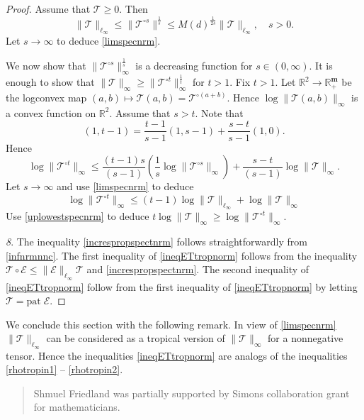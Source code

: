 \documentclass{amsart}
\newcommand{\R}{\mathbb{R}}
\newcommand{\m}{\mathbf{m}}
\newcommand{\0}{\mathbf{0}}
\newcommand{\1}{\mathbf{1}}
\newcommand{\cE}{\mathcal{E}}
\newcommand{\cT}{\mathcal{T}}
\newcommand{\pat}{\mathrm{pat}\;}
\theoremstyle{remark}
\numberwithin{equation}{section} %
\renewcommand{\ge}{\geqslant}
\renewcommand{\le}{\leqslant}
\begin{document}
\begin{proof}
 Assume that $\cT\ge 0$.  Then
 \[\|\cT\|_{\ell_{\infty}}\le \|\cT^{\circ s}\|^{\frac{1}{s}}\le M(d)^{\frac{1}{2s}}\|\cT\|_{\ell_{\infty}}, \quad s>0.\]
 Let $s\to\infty$ to deduce \eqref{limspecnrm}.
 
 We now show that $\|\cT^{\circ s}\|^{\frac{1}{s}}_{\infty}$ is a decreasing function for $s\in (0,\infty)$.  It is enough to show that $\|\cT\|_{\infty}\ge \|\cT^{\circ t}\|_{\infty}^{\frac{1} {t}}$
 for $t>1$. Fix $t>1$.
   Let $\R^2\to \R_+^{\m}$ be the logconvex map $(a,b)\mapsto \cT(a,b)=\cT^{\circ(a+b)}$.
 Hence $\log \|\cT(a,b)\|_{\infty}$ is a convex function on $\R^2$.  Assume that $s>t$.  Note that
 \[(1,t-1)=\frac{t-1}{s-1}(1,s-1)+\frac{s-t}{s-1}(1,0).\]
Hence
\[\log\|\cT^{\circ t}\|_{\infty}\le \frac{(t-1)s}{(s-1)}\left(\frac{1}{s}\log\|\cT^{\circ s}\|_\infty\right)+\frac{s-t}{(s-1)}\log\|\cT\|_{\infty}.\]
Let $s\to\infty$ and use  \eqref{limspecnrm} to deduce 
\begin{equation}\label{specnrmtin}
\log\|\cT^{\circ t}\|_{\infty}\le (t-1)\log\|\cT\|_{\ell_{\infty}}+\log\|\cT\|_{\infty}
\end{equation}
Use \eqref{uplowestspecnrm} to deduce $t\log \|\cT\|_{\infty}\ge \log \|\cT^{\circ t}\|_{\infty}$.

\emph{8}. The inequality \eqref{increspropspectnrm} follows straightforwardly from \eqref{infnrmnnc}.  The first inequality of \eqref{ineqETtropnorm} follows from the 
inequality $\cT\circ \cE\le \|\cE\|_{\ell_{\infty}}\cT$ and \eqref{increspropspectnrm}.  The second inequality of \eqref{ineqETtropnorm} follow from the first inequality  of
\eqref{ineqETtropnorm} by letting $\cT=\pat \cE$.
\end{proof}

We conclude this section with the following remark.  In view of \eqref{limspecnrm} $\|\cT\|_{\ell_{\infty}}$ can be considered as a tropical version of $\|\cT\|_{\infty}$
for a nonnegative tensor.  Hence the inequalities \eqref{ineqETtropnorm} are analogs of the inequalities \eqref{rhotropin1} -- \eqref{rhotropin2}.

\renewcommand{\abstractname}{Acknowledgements}
\begin{abstract}
 Shmuel Friedland was partially supported by Simons collaboration grant for mathematicians.
\end{abstract}










 
\end{document}
